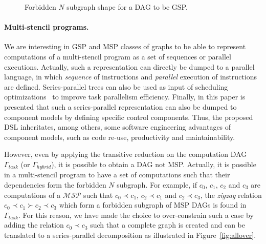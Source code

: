 \begin{figure}[h!]
\begin{center}
  \caption{Forbidden $N$ subgraph shape for a DAG to be GSP.}
  \label{fig:n}
\end{center}
\end{figure}

\paragraph{Multi-stencil programs.}
We are interesting in GSP and MSP classes of graphs to be able to represent computations of a multi-stencil program as a set of sequences or parallel executions. Actually, such a representation can directly be dumped to a parallel language, in which \emph{sequence} of instructions and \emph{parallel} execution of instructions are defined. Series-parallel trees can also be used as input of scheduling optimizations~\cite{Finta1996323,Wang20082684} to improve task parallelism efficiency. Finally, in this paper is presented that such a series-parallel representation can also be dumped to component models by defining specific control components. Thus, the proposed DSL inheritates, among others, some software engineering advantages of component models, such as code re-use, productivity and maintainability.

However, even by applying the transitive reduction on the computation DAG $\Gamma_{task}$ (or $\Gamma_{hybrid}$), it is possible to obtain a DAG not MSP. Actually, it is possible in a multi-stencil program to have a set of computations such that their dependencies form the forbidden $N$ subgraph. For example, if $c_0$, $c_1$, $c_2$ and $c_3$ are computations of a $\mathcal{MSP}$ such that $c_0 \prec c_1$, $c_2 \prec c_1$ and $c_2 \prec c_3$, the \emph{zigzag} relation $c_0 \prec c_1 \succ c_2 \prec c_3$ which form a forbidden subgraph of MSP DAGs is found in $\Gamma_{task}$. For this reason, we have made the choice to over-constrain such a case by adding the relation $c_0 \prec c_3$ such that a complete graph is created and can be translated to a series-parallel decomposition as illustrated in Figure~\ref{fig:allover}.

